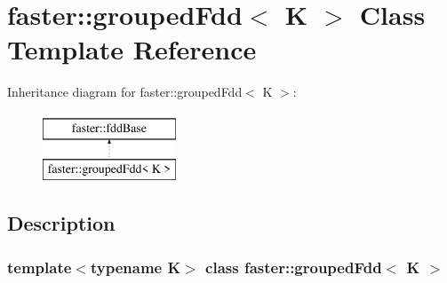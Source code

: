 \hypertarget{classfaster_1_1groupedFdd}{}\section{faster\+:\+:grouped\+Fdd$<$ K $>$ Class Template Reference}
\label{classfaster_1_1groupedFdd}
Inheritance diagram for faster\+:\+:grouped\+Fdd$<$ K $>$\+:\begin{figure}[H]
\begin{center}
\leavevmode
\includegraphics[height=2.000000cm]{classfaster_1_1groupedFdd}
\end{center}
\end{figure}


\subsection{Description}
\subsubsection*{template$<$typename K$>$\newline
class faster\+::grouped\+Fdd$<$ K $>$}

